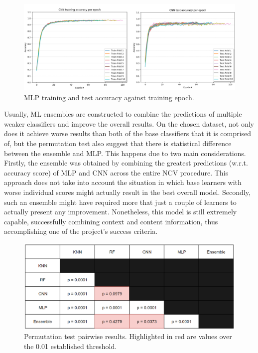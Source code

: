\begin{figure}[H]
  \centering
  \centerline{\includegraphics[scale=0.5]{Images/cnn_train_test.png}}
  \caption{MLP training and test accuracy against training epoch.}
  \label{cnn_train_test}
\end{figure}

Usually, ML ensembles are constructed to combine the predictions of multiple weaker classifiers and improve the overall results. On the chosen dataset, not only does it achieve worse results than both of the base classifiers that it is comprised of, but the permutation test also suggest that there is statistical difference between the ensemble and MLP. This happens due to two main considerations. Firstly, the ensemble was obtained by combining the greatest predictions (w.r.t. accuracy score) of MLP and CNN across the entire NCV procedure. This approach does not take into account the situation in which base learners with worse individual scores might actually result in the best overall model. Secondly, such an ensemble might have required more that just a couple of learners to actually present any improvement. Nonetheless, this model is still extremely capable, successfully combining context and content information, thus accomplishing one of the project's success criteria. \\


\begin{figure}[H]
  \centering
  \centerline{\includegraphics[scale=0.45]{Images/p_values.png}}
  \caption{Permutation test pairwise results. Highlighted in red are values over the 0.01 established threshold.}
  \label{p_values}
\end{figure}





